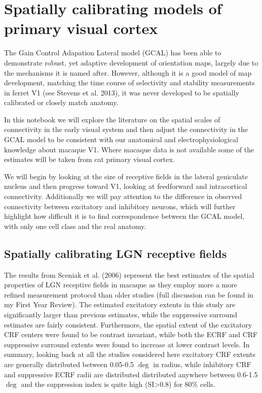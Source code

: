 \chapter{Spatially calibrating models of primary visual cortex}

The Gain Control Adapation Lateral model (GCAL) has been able to
demonstrate robust, yet adaptive development of orientation maps,
largely due to the mechanisms it is named after. However, although it
is a good model of map development, matching the time course of
selectivity and stability measurements in ferret V1 (see Stevens et
al. 2013), it was never developed to be spatially calibrated or
closely match anatomy.

In this notebook we will explore the literature on the spatial scales
of connectivity in the early visual system and then adjust the
connectivity in the GCAL model to be consistent with our anatomical
and electrophysiological knowledge about macaque V1. Where macaque
data is not available some of the estimates will be taken from cat
primary visual cortex.

We will begin by looking at the size of receptive fields in the
lateral geniculate nucleus and then progress toward V1, looking at
feedforward and intracortical connectivity. Additionally we will pay
attention to the difference in observed connectivity between
excitatory and inhibitory neurons, which will further highlight how
difficult it is to find correspondence between the GCAL model, with
only one cell class and the real anatomy.

\section{Spatially calibrating LGN receptive fields}

The results from Sceniak et al. (2006) represent the best estimates of
the spatial properties of LGN receptive fields in macaque as they
employ more a more refined measurement protocol than older studies
(full discussion can be found in my First Year Review). The estimated
excitatory extents in this study are significantly larger than
previous estimates, while the suppressive surround estimates are
fairly consistent. Furthermore, the spatial extent of the excitatory
CRF centers were found to be contrast invariant, while both the ECRF
and CRF suppressive surround extents were found to increase at lower
contrast levels. In summary, looking back at all the studies
considered here excitatory CRF extents are generally distributed
between 0.05-0.5 $\deg$ in radius, while inhibitory CRF and
suppressive ECRF radii are distributed distributed anywhere between
0.6-1.5 $\deg$ and the suppression index is quite high (SI>0.8) for
80\% cells.

